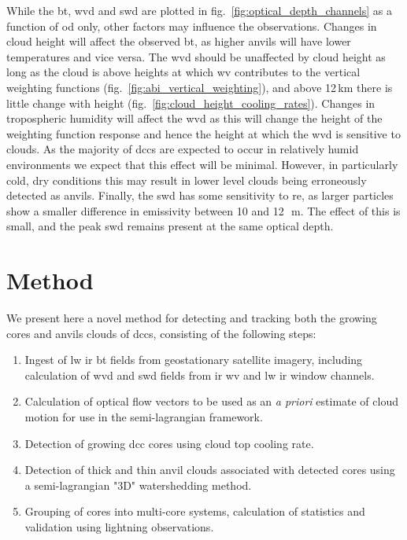 While the \acrshort{bt}, \acrshort{wvd} and \acrshort{swd} are plotted in fig.~\ref{fig:optical_depth_channels} as a function of \acrshort{od} only, other factors may influence the observations.
Changes in cloud height will affect the observed \acrshort{bt}, as higher anvils will have lower temperatures and vice versa.
The \acrshort{wvd} should be unaffected by cloud height as long as the cloud is above heights at which \acrshort{wv} contributes to the vertical weighting functions (fig.~\ref{fig:abi_vertical_weighting}), and above 12\,km there is little change with height (fig.~\ref{fig:cloud_height_cooling_rates}). 
Changes in tropospheric humidity will affect the \acrshort{wvd} as this will change the height of the weighting function response and hence the height at which the \acrshort{wvd} is sensitive to clouds.
As the majority of \acrshort{dcc}s are expected to occur in relatively humid environments we expect that this effect will be minimal.
However, in particularly cold, dry conditions this may result in lower level clouds being erroneously detected as anvils.
Finally, the \acrshort{swd} has some sensitivity to \acrshort{re}, as larger particles show a smaller difference in emissivity between 10 and 12\,\unit{\mu m}.
The effect of this is small, and the peak \acrshort{swd} remains present at the same optical depth.


\section{Method} \label{sec:tracking_method}

We present here a novel method for detecting and tracking both the growing cores and anvils clouds of \acrshort{dcc}s, consisting of the following steps:

\begin{enumerate}
    \item Ingest of \acrshort{lw} \acrshort{ir} \acrshort{bt} fields from geostationary satellite imagery, including calculation of \acrshort{wvd} and \acrshort{swd} fields from \acrshort{ir} \acrshort{wv} and \acrshort{lw} \acrshort{ir} window channels.
    \item Calculation of optical flow vectors to be used as an \textit{a priori} estimate of cloud motion for use in the semi-lagrangian framework.
    \item Detection of growing \acrshort{dcc} cores using cloud top cooling rate.
    \item Detection of thick and thin anvil clouds associated with detected cores using a semi-lagrangian "3D" watershedding method. 
    \item Grouping of cores into multi-core systems, calculation of statistics and validation using lightning observations.
\end{enumerate}



